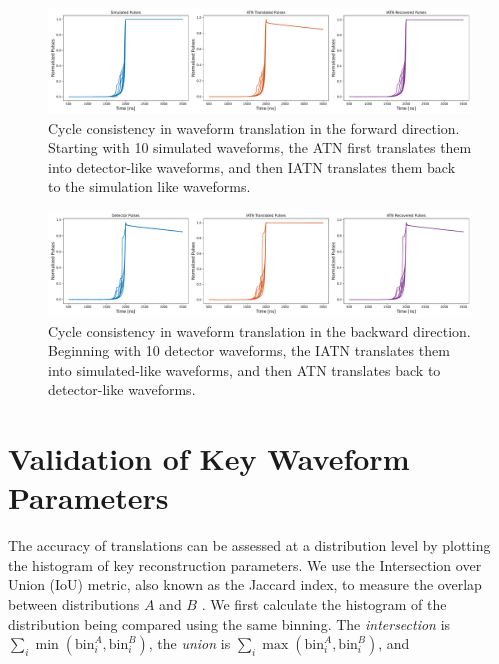 \begin{figure}%
    \centering
    \includegraphics[width=0.99\linewidth]{ch8/figs/SEP_result_comp_1x3_cycle_BAB.pdf}
    \caption{Cycle consistency in waveform translation in the forward direction. Starting with 10 simulated waveforms, the ATN first translates them into detector-like waveforms, and then IATN translates them back to the simulation like waveforms.}
    \label{fig:cycle_bab}
\end{figure}

\begin{figure}%
    \centering
    \includegraphics[width=0.99\linewidth]{ch8/figs/SEP_result_comp_1x3_cycle_ABA.pdf}
    \caption{Cycle consistency in waveform translation in the backward direction. Beginning with 10 detector waveforms, the IATN translates them into simulated-like waveforms, and then ATN translates back to detector-like waveforms.}
    \label{fig:cycle_aba}
\end{figure}

\section{Validation of Key Waveform Parameters}
 The accuracy of translations can be assessed at a distribution level by plotting the histogram of key reconstruction parameters. We use the Intersection over Union (IoU) metric, also known as the Jaccard index, to measure the overlap between distributions $A$ and $B$ \cite{murphy1996finley, jaccard_index}. We first calculate the histogram of the distribution being compared using the same binning. The \textit{intersection} is $\sum_{i} \min(\text{bin}_i^A, \text{bin}_i^B)$, the \textit{union} is $\sum_{i} \max(\text{bin}_i^A, \text{bin}_i^B)$, and
 
